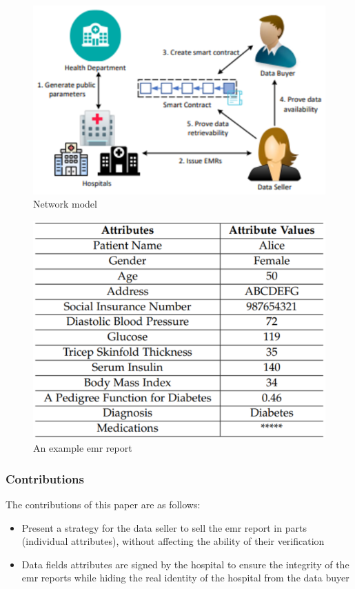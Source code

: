 \begin{figure}
\centering
  \includegraphics[width=0.96\linewidth]{imgs/23-network-model.eps}
  \caption{Network model~\cite{xue2023blockchain}}
  \label{fig:network_model}
\end{figure}

\begin{figure}
\centering
  \includegraphics[width=0.8\linewidth]{imgs/23-example-emr-report.eps}
  \caption{An example \ac{emr} report~\cite{xue2023blockchain}}
  \label{fig:example-emr-report}
\end{figure}

\subsubsection{Contributions}
The contributions of this paper are as follows:
\begin{itemize}
    \item Present a strategy for the data seller to sell the \ac{emr} report in parts (individual attributes), without affecting the ability of their verification
    \item Data fields attributes are signed by the hospital to ensure the integrity of the \ac{emr} reports while hiding the real identity of the hospital from the data buyer
\end{itemize}

